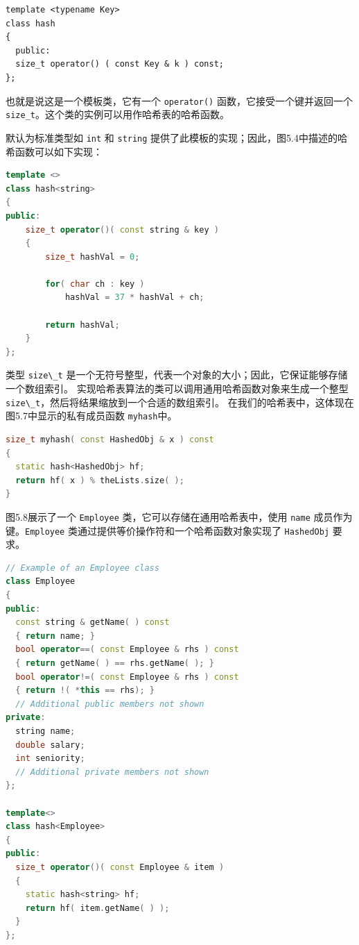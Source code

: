\documentclass[a4paper]{ctexart}
\theoremstyle{definition}
\theoremstyle{definition}
\begin{document}
\begin{lstlisting}
template <typename Key>
class hash
{
  public:
  size_t operator() ( const Key & k ) const;
};
\end{lstlisting}

也就是说这是一个模板类，它有一个 \verb|operator()| 函数，它接受一个键并返回一个 \verb|size_t|。这个类的实例可以用作哈希表的哈希函数。

默认为标准类型如 \verb|int| 和 \verb|string| 提供了此模板的实现；因此，图5.4中描述的哈希函数可以如下实现：

\begin{lstlisting}[language=C++]
template <>
class hash<string>
{
public:
    size_t operator()( const string & key )
    {
        size_t hashVal = 0;

        for( char ch : key )
            hashVal = 37 * hashVal + ch;

        return hashVal;
    }
};
\end{lstlisting}

类型 \verb|size\_t| 是一个无符号整型，代表一个对象的大小；因此，它保证能够存储一个数组索引。
实现哈希表算法的类可以调用通用哈希函数对象来生成一个整型 \verb|size\_t|，然后将结果缩放到一个合适的数组索引。
在我们的哈希表中，这体现在图5.7中显示的私有成员函数 \verb|myhash|中。

\begin{lstlisting}[language=C++]
size_t myhash( const HashedObj & x ) const
{
  static hash<HashedObj> hf;
  return hf( x ) % theLists.size( );
}  
\end{lstlisting}

图5.8展示了一个 \verb|Employee| 类，它可以存储在通用哈希表中，使用 \verb|name| 成员作为键。\verb|Employee|
类通过提供等价操作符和一个哈希函数对象实现了 \verb|HashedObj| 要求。

\begin{lstlisting}[language=C++]
// Example of an Employee class
class Employee
{
public:
  const string & getName( ) const
  { return name; }
  bool operator==( const Employee & rhs ) const
  { return getName( ) == rhs.getName( ); }
  bool operator!=( const Employee & rhs ) const
  { return !( *this == rhs); }
  // Additional public members not shown
private:
  string name;
  double salary;
  int seniority;
  // Additional private members not shown
};
  
template<>
class hash<Employee>
{
public:
  size_t operator()( const Employee & item )
  {
    static hash<string> hf;
    return hf( item.getName( ) );
  }
};
\end{lstlisting}
\end{document}
